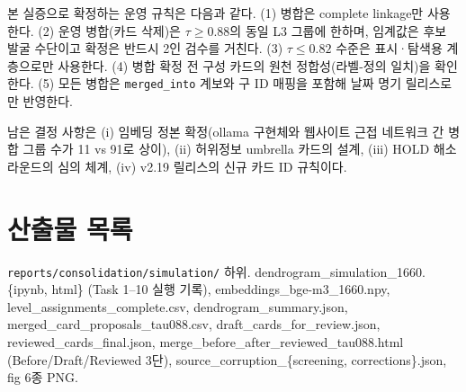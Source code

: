 \documentclass[11pt,a4paper]{article}
\begin{document}
본 실증으로 확정하는 운영 규칙은 다음과 같다. (1) 병합은 complete linkage만 사용한다. (2) 운영 병합(카드 삭제)은 $\tau \geq 0.88$의 동일 L3 그룹에 한하며, 임계값은 후보 발굴 수단이고 확정은 반드시 2인 검수를 거친다. (3) $\tau \leq 0.82$ 수준은 표시·탐색용 계층으로만 사용한다. (4) 병합 확정 전 구성 카드의 원천 정합성(라벨-정의 일치)을 확인한다. (5) 모든 병합은 \texttt{merged\_into} 계보와 구 ID 매핑을 포함해 날짜 명기 릴리스로만 반영한다.

남은 결정 사항은 (i) 임베딩 정본 확정(ollama 구현체와 웹사이트 근접 네트워크 간 병합 그룹 수가 11 vs 91로 상이), (ii) 허위정보 umbrella 카드의 설계, (iii) HOLD 해소 라운드의 심의 체계, (iv) v2.19 릴리스의 신규 카드 ID 규칙이다.

\section*{산출물 목록}

\texttt{reports/consolidation/simulation/} 하위. dendrogram\_simulation\_1660.\{ipynb, html\} (Task 1--10 실행 기록), embeddings\_bge-m3\_1660.npy, level\_assignments\_complete.csv, dendrogram\_summary.json, merged\_card\_proposals\_tau088.csv, draft\_cards\_for\_review.json, reviewed\_cards\_final.json, merge\_before\_after\_reviewed\_tau088.html (Before/Draft/Reviewed 3단), source\_corruption\_\{screening, corrections\}.json, fig 6종 PNG.
\end{document}
